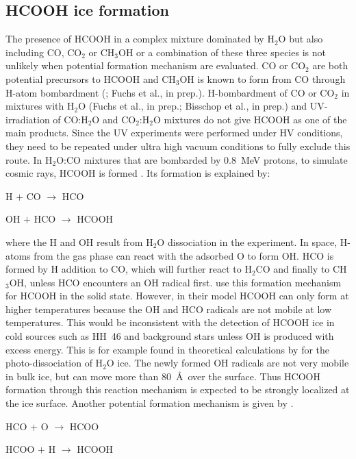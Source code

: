 \documentclass{aa}
\begin{document}
\subsection{HCOOH ice formation}

The presence of HCOOH in a complex mixture dominated by H$_2$O but
also including CO, CO$_2$ or CH$_3$OH or a combination of these three
species is not unlikely when potential formation mechanism are
evaluated. CO or CO$_2$ are both potential precursors to HCOOH and
CH$_3$OH is known to form from CO through H-atom bombardment
(\citealp{watanabe2004}; Fuchs et al., in prep.). H-bombardment of CO
or CO$_2$ in mixtures with H$_2$O (Fuchs et al., in prep.; Bisschop et
al., in prep.) and UV-irradiation of CO:H$_2$O and CO$_2$:H$_2$O
mixtures \citep{watanabe2004,watanabe2002,gerakines2000} do not give
HCOOH as one of the main products. Since the UV experiments were
performed under HV conditions, they need to be repeated under ultra
high vacuum conditions to fully exclude this route. In H$_2$O:CO
mixtures that are bombarded by 0.8~MeV protons, to simulate cosmic
rays, HCOOH is formed \citep{hudson1999}. Its formation is explained
by:

\noindent H $+$ CO $\rightarrow$  HCO

\noindent OH $+$ HCO $\rightarrow$ HCOOH

\noindent where the H and OH result from H$_2$O dissociation in the
experiment. In space, H-atoms from the gas phase can react with the
adsorbed O to form OH. HCO is formed by H addition to CO, which will
further react to H$_2$CO and finally to CH$_3$OH, unless HCO
encounters an OH radical first. \citet{garrod2006} use this formation
mechanism for HCOOH in the solid state. However, in their model HCOOH
can only form at higher temperatures because the OH and HCO radicals
are not mobile at low temperatures. This would be inconsistent with
the detection of HCOOH ice in cold sources such as HH~46 and
background stars unless OH is produced with excess energy. This is for
example found in theoretical calculations by \citet{andersson2006} for
the photo-dissociation of H$_2$O ice. The newly formed OH radicals are
not very mobile in bulk ice, but can move more than 80~\AA\ over the
surface. Thus HCOOH formation through this reaction mechanism is
expected to be strongly localized at the ice surface. Another
potential formation mechanism is given by \citet{keane2001}.

\noindent HCO $+$ O $\rightarrow$ HCOO

\noindent HCOO $+$ H $\rightarrow$ HCOOH
\end{document}

